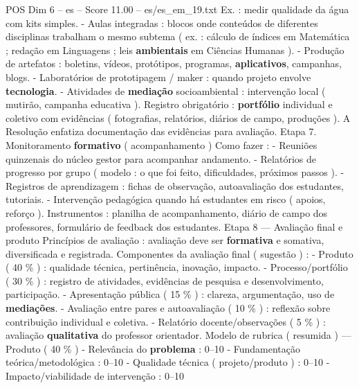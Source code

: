 \begin{textsample}{POS Dim 6 – es – Score 11.00 – es/es\_em\_19.txt}
Ex. : medir qualidade da água com kits simples. - Aulas integradas : blocos onde conteúdos de diferentes disciplinas trabalham o mesmo subtema ( ex. : cálculo de índices em Matemática ; redação em Linguagens ; leis \textbf{ambientais} em Ciências Humanas ). - Produção de artefatos : boletins, vídeos, protótipos, programas, \textbf{aplicativos}, campanhas, blogs. - Laboratórios de prototipagem / maker : quando projeto envolve \textbf{tecnologia}. - Atividades de \textbf{mediação} socioambiental : intervenção local ( mutirão, campanha educativa ).
Registro obrigatório : \textbf{portfólio} individual e coletivo com evidências ( fotografias, relatórios, diários de campo, produções ).
A Resolução enfatiza documentação das evidências para avaliação.
Etapa 7.
Monitoramento \textbf{formativo} ( acompanhamento ) Como fazer : - Reuniões quinzenais do núcleo gestor para acompanhar andamento. - Relatórios de progresso por grupo ( modelo : o que foi feito, dificuldades, próximos passos ). - Registros de aprendizagem : fichas de observação, autoavaliação dos estudantes, tutoriais. - Intervenção pedagógica quando há estudantes em risco ( apoios, reforço ).
Instrumentos : planilha de acompanhamento, diário de campo dos professores, formulário de feedback dos estudantes.
Etapa 8 — Avaliação final e produto Princípios de avaliação : avaliação deve ser \textbf{formativa} e somativa, diversificada e registrada.
Componentes da avaliação final ( sugestão ) : - Produto ( 40 \% ) : qualidade técnica, pertinência, inovação, impacto. - Processo/portfólio ( 30 \% ) : registro de atividades, evidências de pesquisa e desenvolvimento, participação. - Apresentação pública ( 15 \% ) : clareza, argumentação, uso de \textbf{mediações}. - Avaliação entre pares e autoavaliação ( 10 \% ) : reflexão sobre contribuição individual e coletiva. - Relatório docente/observações ( 5 \% ) : avaliação \textbf{qualitativa} do professor orientador.
Modelo de rubrica ( resumida ) — Produto ( 40 \% ) - Relevância do \textbf{problema} : 0–10 - Fundamentação teórica/metodológica : 0–10 - Qualidade técnica ( projeto/produto ) : 0–10 - Impacto/viabilidade de intervenção : 0–10

\end{textsample}
